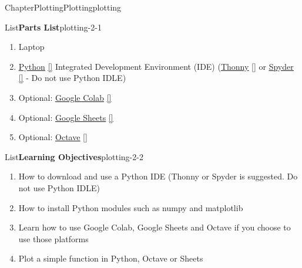 \documentclass[oneside,10pt,]{book}
\newcommand{\xreffont}{\relax}
\newcommand{\linkhilite}[1]{\underline{#1}}
\numberwithin{equation}{section}
\begin{document}
\begin{chapterptx}{Chapter}{Plotting}{}{Plotting}{}{}{plotting}
\renewcommand*{\chaptername}{Chapter}
\begin{introduction}{}%
\begin{listptx}{List}{\textbf{Parts List}}{plotting-2-1}{}%
%
\begin{enumerate}
\item{}Laptop%
\item{}\href{https://www.python.org/}{\linkhilite{Python}} \hyperlink{python}{\linkhilite{[{\xreffont 51}]}} Integrated Development Environment (IDE) (\href{https://thonny.org/}{\linkhilite{Thonny}} \hyperlink{thonny}{\linkhilite{[{\xreffont 52}]}} or \href{https://www.spyder-ide.org/}{\linkhilite{Spyder}} \hyperlink{spyder}{\linkhilite{[{\xreffont 53}]}} - Do not use Python IDLE)%
\item{}Optional: \href{https://colab.research.google.com/}{\linkhilite{Google Colab}} \hyperlink{colab}{\linkhilite{[{\xreffont 54}]}}%
\item{}Optional: \href{https://sheets.google.com/}{\linkhilite{Google Sheets}} \hyperlink{sheets}{\linkhilite{[{\xreffont 69}]}}%
\item{}Optional: \href{https://www.gnu.org/software/octave/}{\linkhilite{Octave}} \hyperlink{octave}{\linkhilite{[{\xreffont 68}]}}%
\end{enumerate}
\end{listptx}%
\begin{listptx}{List}{\textbf{Learning Objectives}}{plotting-2-2}{}%
%
\begin{enumerate}
\item{}How to download and use a Python IDE (Thonny or Spyder is suggested. Do not use Python IDLE)%
\item{}How to install Python modules such as numpy and matplotlib%
\item{}Learn how to use Google Colab, Google Sheets and Octave if you choose to use those platforms%
\item{}Plot a simple function in Python, Octave or Sheets%
\end{enumerate}
\end{listptx}%

\end{introduction}
\end{chapterptx}
\end{document}
